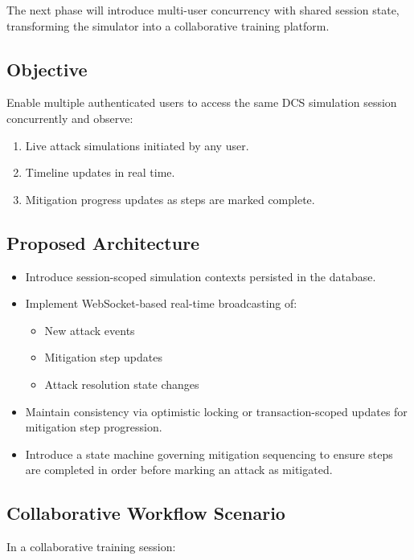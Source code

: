 \documentclass[12pt]{article}
\begin{document}
The next phase will introduce multi-user concurrency with shared session state, transforming the simulator into a collaborative training platform.

\subsection{Objective}

Enable multiple authenticated users to access the same DCS simulation session concurrently and observe:

\begin{enumerate}[leftmargin=1.5em]
\item Live attack simulations initiated by any user.
\item Timeline updates in real time.
\item Mitigation progress updates as steps are marked complete.
\end{enumerate}

\subsection{Proposed Architecture}

\begin{itemize}[leftmargin=1.5em]
\item Introduce session-scoped simulation contexts persisted in the database.
\item Implement WebSocket-based real-time broadcasting of:
  \begin{itemize}
  \item New attack events
  \item Mitigation step updates
  \item Attack resolution state changes
  \end{itemize}
\item Maintain consistency via optimistic locking or transaction-scoped updates for mitigation step progression.
\item Introduce a state machine governing mitigation sequencing to ensure steps are completed in order before marking an attack as mitigated.
\end{itemize}

\subsection{Collaborative Workflow Scenario}

In a collaborative training session:
\end{document}

